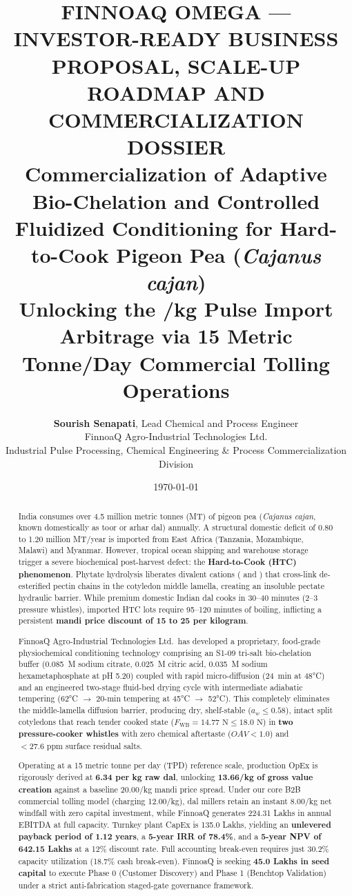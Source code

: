 \documentclass[10pt,a4paper]{article}
\title{\textbf{\LARGE FINNOAQ OMEGA --- INVESTOR-READY BUSINESS PROPOSAL, SCALE-UP ROADMAP AND COMMERCIALIZATION DOSSIER}\\[0.4em]
\large Commercialization of Adaptive Bio-Chelation and Controlled Fluidized Conditioning for Hard-to-Cook Pigeon Pea (\textit{Cajanus cajan})\\[0.2em]
\normalsize Unlocking the \inr 20/kg Pulse Import Arbitrage via 15 Metric Tonne/Day Commercial Tolling Operations}
\author{\textbf{Sourish Senapati}, Lead Chemical and Process Engineer\\
FinnoaQ Agro-Industrial Technologies Ltd.\\
Industrial Pulse Processing, Chemical Engineering \& Process Commercialization Division}
\date{\today}
\newcommand{\inr}{\text{INR~}}
\begin{document}
\maketitle

\begin{abstract}
\noindent India consumes over \num{4.5} million metric tonnes (MT) of pigeon pea (\textit{Cajanus cajan}, known domestically as toor or arhar dal) annually. A structural domestic deficit of \num{0.80} to \num{1.20} million MT/year is imported from East Africa (Tanzania, Mozambique, Malawi) and Myanmar. However, tropical ocean shipping and warehouse storage trigger a severe biochemical post-harvest defect: the \textbf{Hard-to-Cook (HTC) phenomenon}. Phytate hydrolysis liberates divalent cations ( and ) that cross-link de-esterified pectin chains in the cotyledon middle lamella, creating an insoluble pectate hydraulic barrier. While premium domestic Indian dal cooks in 30--40 minutes (2--3 pressure whistles), imported HTC lots require 95--120 minutes of boiling, inflicting a persistent \textbf{mandi price discount of \inr 15 to \inr 25 per kilogram}.

FinnoaQ Agro-Industrial Technologies Ltd.\ has developed a proprietary, food-grade physiochemical conditioning technology comprising an S1-09 tri-salt bio-chelation buffer (\SI{0.085}{M} sodium citrate, \SI{0.025}{M} citric acid, \SI{0.035}{M} sodium hexametaphosphate at pH 5.20) coupled with rapid micro-diffusion (24~min at 48\si{\celsius}) and an engineered two-stage fluid-bed drying cycle with intermediate adiabatic tempering (62\si{\celsius} $\to$ 20-min tempering at 45\si{\celsius} $\to$ 52\si{\celsius}). This completely eliminates the middle-lamella diffusion barrier, producing dry, shelf-stable ($a_w \le 0.58$), intact split cotyledons that reach tender cooked state ($F_{\mathrm{WB}} = 14.77\text{ N} \le 18.0\text{ N}$) in \textbf{two pressure-cooker whistles} with zero chemical aftertaste ($OAV < 1.0$) and $< 27.6\text{ ppm}$ surface residual salts.

Operating at a 15 metric tonne per day (TPD) reference scale, production OpEx is rigorously derived at \textbf{\inr 6.34 per kg raw dal}, unlocking \textbf{\inr 13.66/kg of gross value creation} against a baseline \inr 20.00/kg mandi price spread. Under our core B2B commercial tolling model (charging \inr 12.00/kg), dal millers retain an instant \inr 8.00/kg net windfall with zero capital investment, while FinnoaQ generates \inr 224.31 Lakhs in annual EBITDA at full capacity. Turnkey plant CapEx is \inr 135.0 Lakhs, yielding an \textbf{unlevered payback period of 1.12 years}, a \textbf{5-year IRR of 78.4\%}, and a \textbf{5-year NPV of \inr 642.15 Lakhs} at a 12\% discount rate. Full accounting break-even requires just 30.2\% capacity utilization (18.7\% cash break-even). FinnoaQ is seeking \textbf{\inr 45.0 Lakhs in seed capital} to execute Phase 0 (Customer Discovery) and Phase 1 (Benchtop Validation) under a strict anti-fabrication staged-gate governance framework.
\end{abstract}
\end{document}
